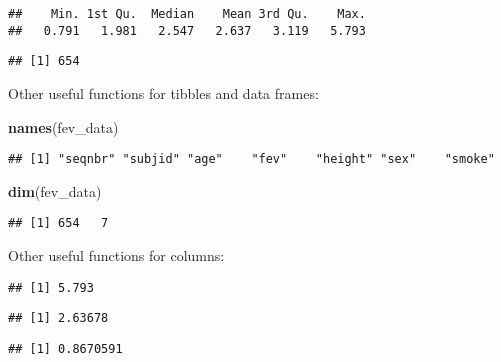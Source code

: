 \documentclass[
]{article}
\newenvironment{Shaded}{\begin{snugshade}}{\end{snugshade}}
\newcommand{\FunctionTok}[1]{\textcolor[rgb]{0.13,0.29,0.53}{\textbf{#1}}}
\newcommand{\NormalTok}[1]{#1}
\newcommand{\SpecialCharTok}[1]{\textcolor[rgb]{0.81,0.36,0.00}{\textbf{#1}}}
\begin{document}
\begin{verbatim}
##    Min. 1st Qu.  Median    Mean 3rd Qu.    Max. 
##   0.791   1.981   2.547   2.637   3.119   5.793
\end{verbatim}

\begin{Shaded}
\end{Shaded}

\begin{verbatim}
## [1] 654
\end{verbatim}

Other useful functions for tibbles and data frames:

\begin{Shaded}
\begin{Highlighting}[]
\FunctionTok{names}\NormalTok{(fev\_data)}
\end{Highlighting}
\end{Shaded}

\begin{verbatim}
## [1] "seqnbr" "subjid" "age"    "fev"    "height" "sex"    "smoke"
\end{verbatim}

\begin{Shaded}
\begin{Highlighting}[]
\FunctionTok{dim}\NormalTok{(fev\_data)}
\end{Highlighting}
\end{Shaded}

\begin{verbatim}
## [1] 654   7
\end{verbatim}

Other useful functions for columns:

\begin{Shaded}
\end{Shaded}

\begin{verbatim}
## [1] 5.793
\end{verbatim}

\begin{Shaded}
\end{Shaded}

\begin{verbatim}
## [1] 2.63678
\end{verbatim}

\begin{Shaded}
\end{Shaded}

\begin{verbatim}
## [1] 0.8670591
\end{verbatim}
\end{document}
